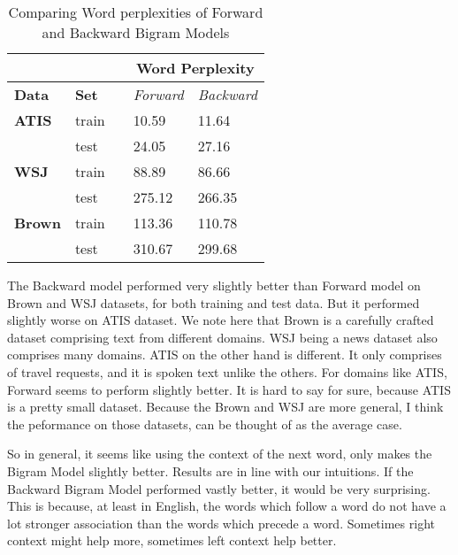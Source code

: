 \documentclass{article}
\begin{document}
\begin{table}[h]
\centering
\begin{tabular}{@{}lllll@{}}
\toprule
\textbf{}      & \textbf{}    &  & \multicolumn{2}{c}{\textbf{Word Perplexity}} \\ \midrule
\textbf{Data}  & \textbf{Set} &  & \textit{Forward}     & \textit{Backward}     \\ \midrule
\textbf{ATIS}  & train        &  & 10.59               & 11.64               \\ \midrule
               & test         &  & 24.05               & 27.16                \\ \midrule
\textbf{WSJ}   & train        &  & 88.89               & 86.66                \\ \midrule
               & test         &  & 275.12               & 266.35               \\ \midrule
\textbf{Brown} & train        &  & 113.36              & 110.78                \\ \midrule
               & test         &  & 310.67              & 299.68               \\ \bottomrule
\end{tabular}
\caption{Comparing Word perplexities of Forward and Backward Bigram Models}
\label{backvforw}
\end{table}
The Backward model performed very slightly better than Forward model on Brown and WSJ datasets, for both training and test data. But it performed slightly worse on ATIS dataset. We note here that Brown is a carefully crafted dataset comprising text from different domains. WSJ being a news dataset also comprises many domains. ATIS on the other hand is different. It only comprises of travel requests, and it is spoken text unlike the others. For domains like ATIS, Forward seems to perform slightly better. It is hard to say for sure, because ATIS is a pretty small dataset. Because the Brown and WSJ are more general, I think the peformance on those datasets, can be thought of as the average case. 

So in general, it seems like using the context of the next word, only makes the Bigram Model slightly better. Results are in line with our intuitions. If the Backward Bigram Model performed vastly better, it would be very surprising. This is because, at least in English, the words which follow a word do not have a lot stronger association than the words which precede a word. Sometimes right context might help more, sometimes left context help better. 
\end{document}
